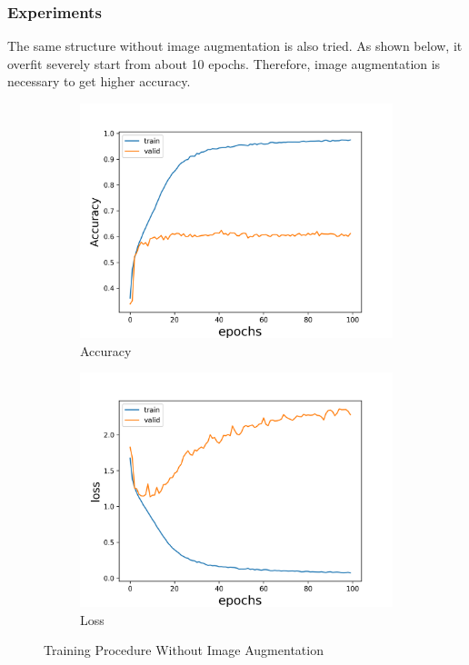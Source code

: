 \documentclass[fleqn,a4paper,12pt]{article}
\begin{document}
\subsubsection*{Experiments}

The same structure without image augmentation is also tried. As shown below, it overfit severely start from about 10 epochs. Therefore, image augmentation is necessary to get higher accuracy.

\begin{figure}[h]
\centering
\begin{subfigure}{.5\textwidth}
  \centering
  \includegraphics[width=\linewidth]{report-imgs/accuracy-without-aug.png}
  \caption{Accuracy}
  \label{fig:sub1}
\end{subfigure}%
\begin{subfigure}{.5\textwidth}
  \centering
  \includegraphics[width=\linewidth]{report-imgs/loss-without-aug.png}
  \caption{Loss}
  \label{fig:sub2}
\end{subfigure}
\caption{Training Procedure Without Image Augmentation}
\label{fig:test}
\end{figure}
\end{document}
